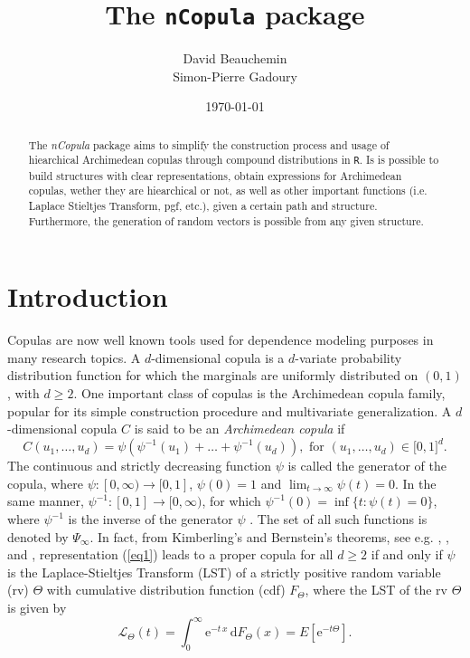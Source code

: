 \documentclass[11pt, english]{article}\usepackage[]{graphicx}\usepackage[]{color}
\title{The \texttt{nCopula} package}
\author{David Beauchemin \\ Simon-Pierre Gadoury}
\date{\today}
\begin{document}
\maketitle

\begin{abstract}
The \emph{nCopula} package aims to simplify the construction process and usage of hiearchical Archimedean copulas through compound distributions in \texttt{R}. Is is possible to build structures with clear representations, obtain expressions for Archimedean copulas, wether they are hiearchical or not, as well as other important functions (i.e. Laplace Stieltjes Transform, pgf, etc.), given a certain path and structure. Furthermore, the generation of random vectors is possible from any given structure.
\end{abstract}

\section{Introduction}

Copulas are now well known tools used for dependence modeling purposes in
many research topics. A $d$-dimensional copula is a $d$-variate probability
distribution function for which the marginals are uniformly distributed on $%
(0,1)$, with $d\geq 2$. One important class of copulas is the Archimedean
copula family, popular for its simple construction procedure and
multivariate generalization. A $d$-dimensional copula $C$ is said to be an \emph{Archimedean
copula} if
\begin{equation}
C(u_{1},\ldots ,u_{d})=\psi \left( \psi ^{-1}(u_{1})+\ldots +\psi
^{-1}(u_{d})\right) ,\,\,\text{for}\,\,(u_{1},\ldots ,u_{d})\in \lbrack
0,1]^{d}.  \label{eq1}
\end{equation}%
The continuous and strictly decreasing function $\psi $ is called the
generator of the copula, where $\psi :[0,\infty )\rightarrow \lbrack 0,1]$, $%
\psi (0)=1$ and $\displaystyle\lim_{t\rightarrow \infty }\psi (t)=0$. In
the same manner, $\psi ^{-1}:[0,1]\rightarrow \lbrack 0,\infty )$, for which
  $\psi ^{-1}(0)=\inf
\{t:\psi (t)=0\}$, where $\psi ^{-1}$ is the inverse of the generator $\psi $%
. The set of all such functions is denoted by $\Psi_\infty$. In fact, from Kimberling's and Bernstein's theorems, see e.g. \cite%
{kimberling}, \cite{feller}, and \cite{hofert}, representation (\ref{eq1})
leads to a proper copula for all $d\geq 2$ if and only if $\psi $ is the
Laplace-Stieltjes Transform (LST) of a strictly positive random variable (rv) $\Theta $ with cumulative distribution function (cdf) $F_{\Theta}$, where the LST of the rv $\Theta $ is given by
\begin{equation}
  \mathcal{L}_{\Theta}(t) = \int_{0}^{\infty} \mathrm{e}^{-t \, x} \, \mathrm{d} F_{\Theta}(x)=E\left[\mathrm{e}^{-t{\Theta}}\right].
\end{equation}
\end{document}
